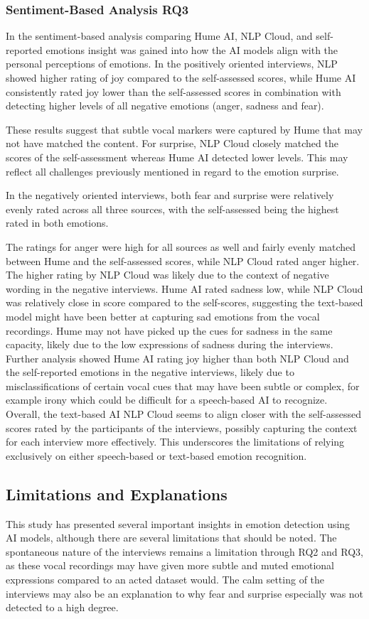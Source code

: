 \subsubsection{Sentiment-Based Analysis RQ3}
In the sentiment-based analysis comparing Hume AI, NLP Cloud, and self-reported emotions insight was gained into how the AI models align with the personal perceptions of emotions.
In the positively oriented interviews, NLP showed higher rating of joy compared to the self-assessed scores, while Hume AI consistently rated joy lower than the self-assessed scores in combination with detecting higher levels of all negative emotions (anger, sadness and fear).

These results suggest that subtle vocal markers were captured by Hume that may not have matched the content.
For surprise, NLP Cloud closely matched the scores of the self-assessment whereas Hume AI detected lower levels. This may reflect all challenges previously mentioned in regard to the emotion surprise.

In the negatively oriented interviews, both fear and surprise were relatively evenly rated across all three sources, with the self-assessed being the highest rated in both emotions.

The ratings for anger were high for all sources as well and fairly evenly matched between Hume and the self-assessed scores, while NLP Cloud rated anger higher. The higher rating by NLP Cloud was likely due to the context of negative wording in the negative interviews.
Hume AI rated sadness low, while NLP Cloud was relatively close in score compared to the self-scores, suggesting the text-based model might have been better at capturing sad emotions from the vocal recordings. Hume may not have picked up the cues for sadness in the same capacity, likely due to the low expressions of sadness during the interviews. 
Further analysis showed Hume AI rating joy higher than both NLP Cloud and the self-reported emotions in the negative interviews, likely due to misclassifications of certain vocal cues that may have been subtle or complex, for example irony which could be difficult for a speech-based AI to recognize. 
Overall, the text-based AI NLP Cloud seems to align closer with the self-assessed scores rated by the participants of the interviews, possibly capturing the context for each interview more effectively. This underscores the limitations of relying exclusively on either speech-based or text-based emotion recognition.

\subsection{Limitations and Explanations}
This study has presented several important insights in emotion detection using AI models, although there are several limitations that should be noted.
The spontaneous nature of the interviews remains a limitation through RQ2 and RQ3, as these vocal recordings may have given more subtle and muted emotional expressions compared to an acted dataset would. The calm setting of the interviews may also be an explanation to why fear and surprise especially was not detected to a high degree.

